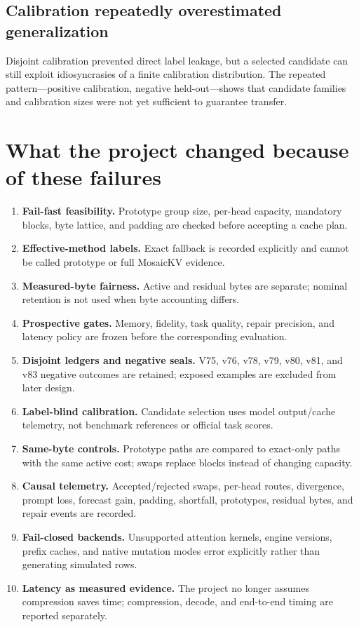\documentclass[11pt]{article}
\begin{document}
\subsection{Calibration repeatedly overestimated generalization}

Disjoint calibration prevented direct label leakage, but a selected candidate can still exploit
idiosyncrasies of a finite calibration distribution.  The repeated pattern---positive calibration,
negative held-out---shows that candidate families and calibration sizes were not yet sufficient to
guarantee transfer.

\section{What the project changed because of these failures}

\begin{enumerate}
  \item \textbf{Fail-fast feasibility.}  Prototype group size, per-head capacity, mandatory blocks,
  byte lattice, and padding are checked before accepting a cache plan.
  \item \textbf{Effective-method labels.}  Exact fallback is recorded explicitly and cannot be
  called prototype or full MosaicKV evidence.
  \item \textbf{Measured-byte fairness.}  Active and residual bytes are separate; nominal retention
  is not used when byte accounting differs.
  \item \textbf{Prospective gates.}  Memory, fidelity, task quality, repair precision, and latency
  policy are frozen before the corresponding evaluation.
  \item \textbf{Disjoint ledgers and negative seals.}  V75, v76, v78, v79, v80, v81, and v83
  negative outcomes are retained; exposed examples are excluded from later design.
  \item \textbf{Label-blind calibration.}  Candidate selection uses model output/cache telemetry,
  not benchmark references or official task scores.
  \item \textbf{Same-byte controls.}  Prototype paths are compared to exact-only paths with the same
  active cost; swaps replace blocks instead of changing capacity.
  \item \textbf{Causal telemetry.}  Accepted/rejected swaps, per-head routes, divergence, prompt loss,
  forecast gain, padding, shortfall, prototypes, residual bytes, and repair events are recorded.
  \item \textbf{Fail-closed backends.}  Unsupported attention kernels, engine versions, prefix
  caches, and native mutation modes error explicitly rather than generating simulated rows.
  \item \textbf{Latency as measured evidence.}  The project no longer assumes compression saves
  time; compression, decode, and end-to-end timing are reported separately.
\end{enumerate}
\end{document}

